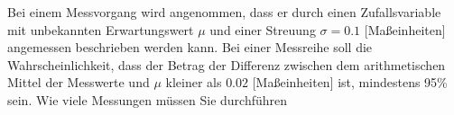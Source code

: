 \documentclass{abgabe}
\begin{document}
\begin{questions}
    \question
    Bei einem Messvorgang wird angenommen, dass er durch einen Zufallsvariable mit unbekannten Erwartungswert $\mu$ und einer Streuung $\sigma = 0.1$ [Maßeinheiten] angemessen beschrieben werden kann. 
    Bei einer Messreihe soll die Wahrscheinlichkeit, dass der Betrag der Differenz zwischen dem arithmetischen Mittel der Messwerte und $\mu$ kleiner als $0.02$ [Maßeinheiten] ist, mindestens 95\% sein. 
    Wie viele Messungen müssen Sie durchführen
\end{questions}
\end{document}
